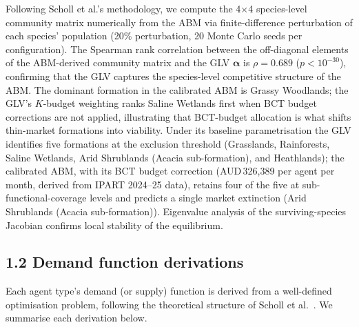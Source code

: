 \documentclass[pdflatex,sn-nature,oneside]{sn-jnl}
\begin{document}
Following Scholl et al.'s methodology, we compute the 4$\times$4 species-level community matrix numerically from the ABM via finite-difference perturbation of each species' population (20\% perturbation, 20 Monte Carlo seeds per configuration). The Spearman rank correlation between the off-diagonal elements of the ABM-derived community matrix and the GLV $\boldsymbol\alpha$ is $\rho = 0.689$ ($p < 10^{-30}$), confirming that the GLV captures the species-level competitive structure of the ABM. The dominant formation in the calibrated ABM is Grassy Woodlands; the GLV's $K$-budget weighting ranks Saline Wetlands first when BCT budget corrections are not applied, illustrating that BCT-budget allocation is what shifts thin-market formations into viability. Under its baseline parametrisation the GLV identifies five formations at the exclusion threshold (Grasslands, Rainforests, Saline Wetlands, Arid Shrublands (Acacia sub-formation), and Heathlands); the calibrated ABM, with its BCT budget correction (AUD\,326,389 per agent per month, derived from IPART 2024--25 data), retains four of the five at sub-functional-coverage levels and predicts a single market extinction (Arid Shrublands (Acacia sub-formation)). Eigenvalue analysis of the surviving-species Jacobian confirms local stability of the equilibrium.


\subsection*{1.2 Demand function derivations}

Each agent type's demand (or supply) function is derived from a well-defined optimisation problem, following the theoretical structure of Scholl et al.~\cite{SchollCalinescuFarmer2021}. We summarise each derivation below.
\end{document}
